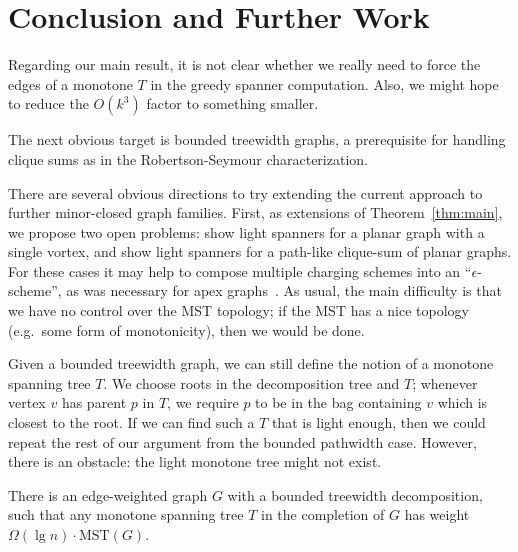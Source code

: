 \documentclass{llncs}
\def\MST{\mbox{MST}}\def\OPT{\mbox{OPT}}\def\Left{\mbox{left}}\def\In#1{\mbox{in$(#1)$}} \def\Out#1{\mbox{out$(#1)$}} \def\Net#1{\mbox{net$(#1)$}} \def\xeP{x_{(e,P)}}
\begin{document}
\section{Conclusion and Further Work}
\label{sec:further}

Regarding our main result, it is not clear whether we really need
to force the edges of a monotone $T$ in the greedy spanner
computation.  Also, we might hope to reduce the $O(k^3)$ factor to
something smaller.  

The next obvious target is bounded treewidth graphs, a prerequisite
for handling clique sums as in the Robertson-Seymour characterization.


There are several obvious directions to try extending the current approach to
further minor-closed graph families.  First, as extensions of
Theorem~\ref{thm:main}, we propose two open problems: show light
spanners for a planar graph with a single vortex, and show light
spanners for a path-like clique-sum of planar graphs.  For these cases
it may help to compose multiple charging schemes into an
``$\epsilon$-scheme'', as was necessary for apex
graphs~\cite{Grigni:2002:LSA:545381.545492}.  As usual, the main
difficulty is that we have no control over the MST topology; if the MST
has a nice topology (e.g.\ some form of monotonicity),
then we would be done.


Given a bounded treewidth graph, we can still define the notion of a
monotone spanning tree $T$.
We choose roots in the decomposition tree and $T$; whenever vertex $v$
has parent $p$ in $T$, we require $p$ to be in the bag containing $v$ which
is closest to the root.
If we can find such a $T$ that is light
enough, then we could repeat the rest of our argument from the bounded
pathwidth case.  However, there is an obstacle: the light monotone
tree might not exist.
\begin{theorem}\label{thm:nomono}
There is an edge-weighted graph $G$ with a bounded treewidth decomposition,
such that any monotone spanning tree $T$ in the completion of $G$
has weight $\Omega(\lg n)\cdot \MST(G)$.
\end{theorem}
\end{document}
